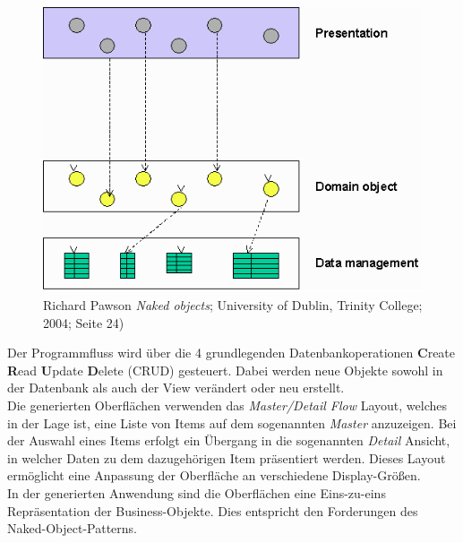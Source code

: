 \documentclass[a4paper,twoside]{article}
\begin{document}
\begin{figure}[!h]
	\centering
	\includegraphics[scale=.5]{pics/NakedObjectPattern.png}
	\caption[Naked-Object-Pattern Architektur nach Richard Pawson, University of Dublin, Trinity College]{ Richard Pawson  \emph{\glqq Naked objects\grqq{}}; University of Dublin, Trinity College; 2004; Seite 24)}
	\label{fig:Grafik3}
\end{figure}

Der Programmfluss wird über die 4 grundlegenden Datenbankoperationen \textbf{C}reate \textbf{R}ead \textbf{U}pdate \textbf{D}elete (CRUD) gesteuert. Dabei werden neue Objekte sowohl in der Datenbank als auch der View verändert oder neu erstellt.\\ 
Die generierten Oberflächen verwenden das \textit{Master/Detail Flow} Layout, welches in der Lage ist, eine Liste von Items auf dem sogenannten \textit{Master} anzuzeigen. Bei der Auswahl eines Items erfolgt ein Übergang in die sogenannten \textit{Detail} Ansicht, in welcher Daten zu dem dazugehörigen Item präsentiert werden. Dieses Layout ermöglicht eine Anpassung der Oberfläche an verschiedene  Display-Größen.\\
In der generierten Anwendung sind die Oberflächen eine Eins-zu-eins Repräsentation der Business-Objekte. Dies entspricht den Forderungen des Naked-Object-Patterns.
\end{document}

